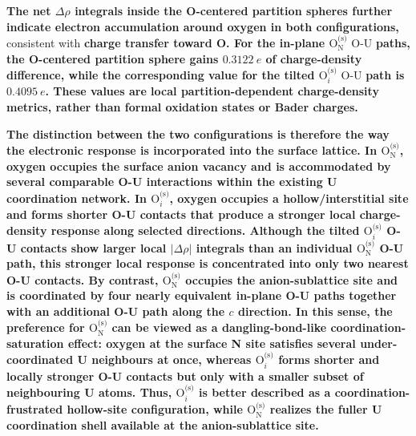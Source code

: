 \documentclass[preprint,12pt,sort&compress]{elsarticle}
\newcommand{\?}{\stackrel{?}{=}}
\providecommand{\DIFaddtex}[1]{{\bf #1}} %
\providecommand{\DIFdeltex}[1]{} %
\providecommand{\DIFaddbegin}{\protect\color{blue}} %
\providecommand{\DIFaddend}{\protect\color{black}} %
\providecommand{\DIFdelbegin}{\protect\color{red}} %
\providecommand{\DIFdelend}{\protect\color{black}} %
\providecommand{\DIFadd}[1]{\texorpdfstring{\DIFaddtex{#1}}{#1}} %
\providecommand{\DIFdel}[1]{\texorpdfstring{\DIFdeltex{#1}}{}} %
\begin{document}
\DIFadd{The net $\Delta\rho$ integrals inside the O-centered partition spheres further indicate electron accumulation around oxygen in both configurations, }\DIFaddend consistent with \DIFdelbegin \DIFdel{the formation of }\DIFdelend \DIFaddbegin \DIFadd{charge transfer toward O. For the in-plane $\mathrm{O}_{\mathrm{N}}^{\text{(s)}}$ }\DIFaddend O-U \DIFdelbegin \DIFdel{bonds reported in~\cite{Bocharov2011JNM}. Bader charge analysis~\cite{Bocharov2011JNM} confirms a substantial charge transfer to the oxygen atom in the $\mathrm{O_N^{(s)}}$ site. The hollowinterstitial site, by contrast, places oxygen between both U and N surface atomsrather than exclusively among uranium nearest neighbors (see \cref{Fig:Oad-2}). Since the nitrogen neighbors do not contribute significantly to bonding, the reduced uranium coordination at the hollow siteresults in weaker O~$2p$-U~$5f$ hybridization compared to $\mathrm{O_N^{(s)}}$.
Charge density difference maps~\cite{Bocharov2011JNM} confirm that the bonding perturbation around oxygen in a nitrogen site is spatially localized and directed along the }\DIFdelend \DIFaddbegin \DIFadd{paths, the O-centered partition sphere gains $0.3122~e$ of charge-density difference, while the corresponding value for the tilted $\mathrm{O}_i^{\text{(s)}}$ }\DIFaddend O-U \DIFdelbegin \DIFdel{bonds. These findings establish that the }\DIFdelend \DIFaddbegin \DIFadd{path is $0.4095~e$. These values are local partition-dependent charge-density metrics, rather than formal oxidation states or Bader charges.
}

\DIFadd{The distinction between the two configurations is therefore the way the electronic response is incorporated into the surface lattice. In $\mathrm{O}_{\mathrm{N}}^{\text{(s)}}$, oxygen occupies the surface anion vacancy and is accommodated by several comparable O-U interactions within the existing U coordination network. In $\mathrm{O}_i^{\text{(s)}}$, oxygen occupies a hollow/interstitial site and forms shorter O-U contacts that produce a stronger local charge-density response along selected directions. Although the tilted $\mathrm{O}_i^{\text{(s)}}$ O-U contacts show larger local $|\Delta\rho|$ integrals than an individual $\mathrm{O}_{\mathrm{N}}^{\text{(s)}}$ O-U path, this stronger local response is concentrated into only two nearest O-U contacts. By contrast, $\mathrm{O}_{\mathrm{N}}^{\text{(s)}}$ occupies the anion-sublattice site and is coordinated by four nearly equivalent in-plane O-U paths together with an additional O-U path along the $c$ direction. In this sense, the preference for $\mathrm{O}_{\mathrm{N}}^{\text{(s)}}$ can be viewed as a dangling-bond-like coordination-saturation effect: oxygen at the surface N site satisfies several under-coordinated U neighbours at once, whereas $\mathrm{O}_i^{\text{(s)}}$ forms shorter and locally stronger O-U contacts but only with a smaller subset of neighbouring U atoms. Thus, $\mathrm{O}_i^{\text{(s)}}$ is better described as a coordination-frustrated hollow-site configuration, while $\mathrm{O}_{\mathrm{N}}^{\text{(s)}}$ realizes the fuller U coordination shell available at the anion-sublattice site.
}
\end{document}
